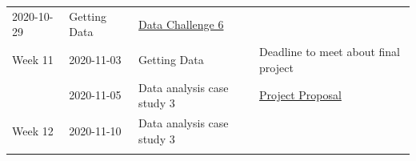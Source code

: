 \documentclass[
]{book}
\begin{document}
\begin{longtable}[]{@{}llll@{}}
\begin{minipage}[t]{0.22\columnwidth}
2020-10-29\strut
\end{minipage} & \begin{minipage}[t]{0.22\columnwidth}\raggedright
Getting Data\strut
\end{minipage} & \begin{minipage}[t]{0.22\columnwidth}\raggedright
\href{https://classroom.github.com/a/6RuMwg7C}{Data Challenge 6}\strut
\end{minipage}\tabularnewline
\begin{minipage}[t]{0.22\columnwidth}\raggedright
Week 11\strut
\end{minipage} & \begin{minipage}[t]{0.22\columnwidth}\raggedright
2020-11-03\strut
\end{minipage} & \begin{minipage}[t]{0.22\columnwidth}\raggedright
Getting Data\strut
\end{minipage} & \begin{minipage}[t]{0.22\columnwidth}\raggedright
Deadline to meet about final project\strut
\end{minipage}\tabularnewline
\begin{minipage}[t]{0.22\columnwidth}\raggedright
\strut
\end{minipage} & \begin{minipage}[t]{0.22\columnwidth}\raggedright
2020-11-05\strut
\end{minipage} & \begin{minipage}[t]{0.22\columnwidth}\raggedright
Data analysis case study 3\strut
\end{minipage} & \begin{minipage}[t]{0.22\columnwidth}\raggedright
\href{final_project_docs/esoc214_project_proposal.pdf}{Project Proposal}\strut
\end{minipage}\tabularnewline
\begin{minipage}[t]{0.22\columnwidth}\raggedright
Week 12\strut
\end{minipage} & \begin{minipage}[t]{0.22\columnwidth}\raggedright
2020-11-10\strut
\end{minipage} & \begin{minipage}[t]{0.22\columnwidth}\raggedright
Data analysis case study 3\strut
\end{minipage} & \begin{minipage}[t]{0.22\columnwidth}\raggedright
\strut
\end{minipage}\tabularnewline
\begin{minipage}[t]{0.22\columnwidth}\raggedright

\end{minipage}
\end{longtable}
\end{document}
